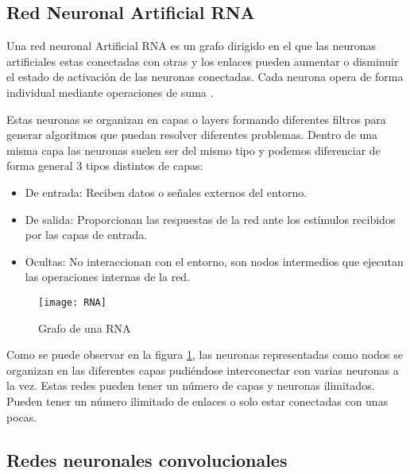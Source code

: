 \subsection{Red Neuronal Artificial RNA}

Una red neuronal Artificial RNA es un grafo dirigido en el que las neuronas artificiales estas conectadas con otras y los enlaces pueden aumentar o disminuir el estado de activación de las neuronas conectadas. Cada neurona opera de forma individual mediante operaciones de suma \cite{wiki:redesNeuronalesArtificiales}.

Estas neuronas se organizan en capas o layers formando diferentes filtros para generar algoritmos que puedan resolver diferentes problemas. Dentro de una misma capa las neuronas suelen ser del mismo tipo y podemos diferenciar de forma general 3 tipos distintos de capas:

\begin{itemize}
	\item{De entrada}: Reciben datos o señales externos del entorno.
	\item{De salida}: Proporcionan las respuestas de la red ante los estímulos recibidos por las capas de entrada.
	\item{Ocultas}: No interaccionan con el entorno, son nodos intermedios que ejecutan las operaciones internas de la red.
\end{itemize}

\begin{figure}[h]
    \begin{center}%
        \begin{center}%
          \texttt{[image: RNA]}%
          \caption{Grafo de una RNA}%
          \label{figRNA}%
        \end{center}%
  	\end{center}%
\end{figure}%

Como se puede observar en la figura \ref{figRNA}, las neuronas representadas como nodos se organizan en las diferentes capas pudiéndose interconectar con varias neuronas a la vez. Estas redes pueden tener un número de capas y neuronas ilimitados. Pueden tener un número ilimitado de enlaces o solo estar conectadas con unas pocas.

\newpage
\subsection{Redes neuronales convolucionales}


